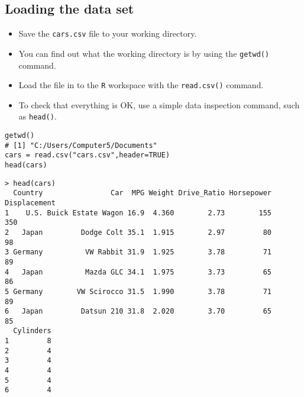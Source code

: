 \documentclass[12pt]{article}
\begin{document}
\newpage

\subsection*{Loading the data set}
\begin{itemize}
\item Save the \texttt{cars.csv} file to your working directory.
\item You can find out what the working directory is by using the \texttt{getwd()} command.
\item Load the file in to the \texttt{R} workspace with the \texttt{read.csv()} command.
\item To check that everything is OK, use a simple data inspection command, such as \texttt{head()}.
\end{itemize}
\begin{framed}
\begin{verbatim}
getwd()
# [1] "C:/Users/Computer5/Documents"
cars = read.csv("cars.csv",header=TRUE)
head(cars)
\end{verbatim}
\end{framed}
\begin{verbatim}
> head(cars)
  Country                Car  MPG Weight Drive_Ratio Horsepower Displacement
1    U.S. Buick Estate Wagon 16.9  4.360        2.73        155          350
2   Japan         Dodge Colt 35.1  1.915        2.97         80           98
3 Germany          VW Rabbit 31.9  1.925        3.78         71           89
4   Japan          Mazda GLC 34.1  1.975        3.73         65           86
5 Germany        VW Scirocco 31.5  1.990        3.78         71           89
6   Japan         Datsun 210 31.8  2.020        3.70         65           85
  Cylinders
1         8
2         4
3         4
4         4
5         4
6         4
\end{verbatim}
\end{document}

